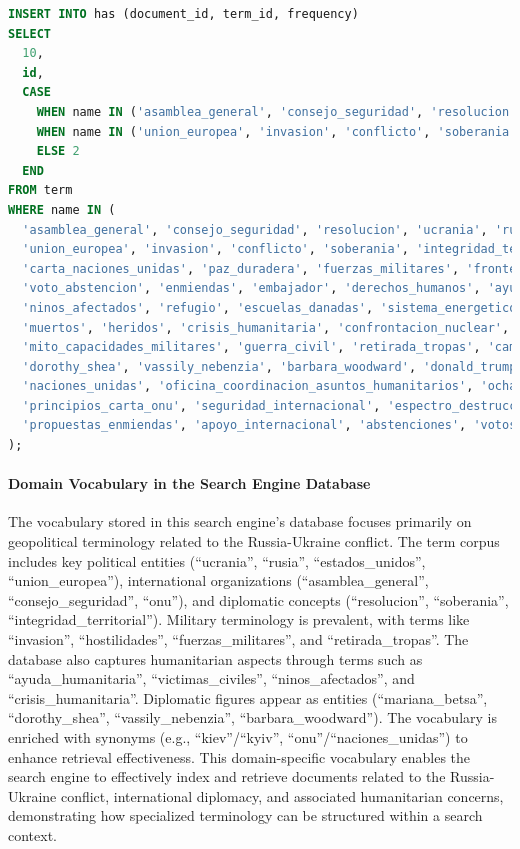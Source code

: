 \documentclass[twoside]{article}
\begin{document}
\begin{lstlisting}[language=SQL,caption={Inserting Frequencies},label={lst:insertfrequencies}]
INSERT INTO has (document_id, term_id, frequency)
SELECT 
  10, 
  id, 
  CASE 
    WHEN name IN ('asamblea_general', 'consejo_seguridad', 'resolucion', 'ucrania', 'rusia', 'estados_unidos') THEN 4
    WHEN name IN ('union_europea', 'invasion', 'conflicto', 'soberania', 'integridad_territorial', 'hostilidades') THEN 3
    ELSE 2 
  END
FROM term 
WHERE name IN (
  'asamblea_general', 'consejo_seguridad', 'resolucion', 'ucrania', 'rusia', 'estados_unidos',
  'union_europea', 'invasion', 'conflicto', 'soberania', 'integridad_territorial', 'hostilidades',
  'carta_naciones_unidas', 'paz_duradera', 'fuerzas_militares', 'fronteras_internacionalmente_reconocidas',
  'voto_abstencion', 'enmiendas', 'embajador', 'derechos_humanos', 'ayuda_humanitaria', 'victimas_civiles',
  'ninos_afectados', 'refugio', 'escuelas_danadas', 'sistema_energetico', 'calefaccion', 'electricidad',
  'muertos', 'heridos', 'crisis_humanitaria', 'confrontacion_nuclear', 'orden_internacional', 'solidaridad',
  'mito_capacidades_militares', 'guerra_civil', 'retirada_tropas', 'camino_paz', 'vetos', 'mariana_betsa',
  'dorothy_shea', 'vassily_nebenzia', 'barbara_woodward', 'donald_trump', 'kiev', 'moscu', 'onu',
  'naciones_unidas', 'oficina_coordinacion_asuntos_humanitarios', 'ocha', 'resolucion_pacifica_disputas',
  'principios_carta_onu', 'seguridad_internacional', 'espectro_destruccion_total', 'causa_profunda_conflicto',
  'propuestas_enmiendas', 'apoyo_internacional', 'abstenciones', 'votos_favor', 'votos_contra'
);
\end{lstlisting}

\paragraph{Domain Vocabulary in the Search Engine Database}
The vocabulary stored in this search engine's database focuses primarily on geopolitical terminology related to the Russia-Ukraine conflict. The term corpus includes key political entities (``ucrania'', ``rusia'', ``estados\_unidos'', ``union\_europea''), international organizations (``asamblea\_general'', ``consejo\_seguridad'', ``onu''), and diplomatic concepts (``resolucion'', ``soberania'', ``integridad\_territorial''). Military terminology is prevalent, with terms like ``invasion'', ``hostilidades'', ``fuerzas\_militares'', and ``retirada\_tropas''. The database also captures humanitarian aspects through terms such as ``ayuda\_humanitaria'', ``victimas\_civiles'', ``ninos\_afectados'', and ``crisis\_humanitaria''. Diplomatic figures appear as entities (``mariana\_betsa'', ``dorothy\_shea'', ``vassily\_nebenzia'', ``barbara\_woodward''). The vocabulary is enriched with synonyms (e.g., ``kiev''/``kyiv'', ``onu''/``naciones\_unidas'') to enhance retrieval effectiveness. This domain-specific vocabulary enables the search engine to effectively index and retrieve documents related to the Russia-Ukraine conflict, international diplomacy, and associated humanitarian concerns, demonstrating how specialized terminology can be structured within a search context.
\end{document}

